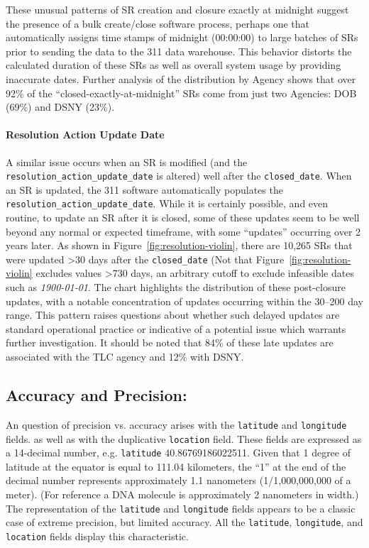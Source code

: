 \documentclass[linenumber]{jdsart}
\begin{document}
These unusual patterns of SR creation and closure exactly at midnight 
suggest the presence of a bulk create/close software process, perhaps one
that automatically assigns time stamps of midnight (00:00:00) to 
large batches of SRs prior to sending the data to the 311 
data warehouse. This behavior distorts the calculated duration of these 
SRs as well as overall system usage by providing inaccurate 
dates. Further analysis of the distribution by Agency shows that over 92\% of 
the ``closed-exactly-at-midnight'' SRs come from just two 
Agencies: DOB (69\%) and DSNY  (23\%).

\paragraph{Resolution Action Update Date}
A similar issue occurs when an SR is modified (and the \texttt{resolution\_action\_update\_date} is altered) well 
after the \texttt{closed\_date}.  When an SR is 
updated, the 311 software automatically populates the \texttt{resolution\_action\_update\_date}. While it is certainly 
possible, and even routine, to update an SR after it is closed, 
some of these updates seem to be well beyond any 
normal or expected timeframe, with some ``updates'' 
occurring over 2 years later. As shown in Figure~\ref{fig:resolution-violin}, 
there are 10,265 SRs that were updated >30 days after the 
\texttt{closed\_date} (Not that Figure~\ref{fig:resolution-violin} excludes 
values >730 days, an arbitrary cutoff to exclude 
infeasible dates such as \textit{1900-01-01}. The chart 
highlights the distribution of these post-closure 
 updates, with a notable concentration of updates occurring within 
the 30--200 day range. This pattern raises 
questions about whether such delayed updates are standard 
operational practice or indicative of a potential issue 
which warrants further investigation. It should be noted
that 84\% of these late updates are associated with the TLC agency
and 12\% with DSNY.


\subsection{Accuracy and Precision:}
\label{sec:precision}
An question of precision vs. accuracy arises with the \texttt{latitude} 
and \texttt{longitude} fields. as well as with the duplicative 
\texttt{location} field. These fields are expressed as
a 14-decimal number, e.g. \texttt{latitude} 40.86769186022511. 
Given that 1 degree of latitude at the equator is equal to 111.04 
kilometers, the ``1'' at the end of the decimal number represents 
approximately 1.1 nanometers (1/1,000,000,000 of a meter). (For 
reference a DNA molecule is approximately 2 nanometers in width.) The 
representation of the \texttt{latitude} and \texttt{longitude} fields
appears to be a classic case of extreme precision, but limited 
accuracy. All the \texttt{latitude}, \texttt{longitude}, and \texttt{location}
fields display this characteristic. 
\end{document}
